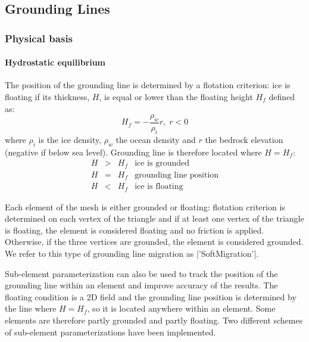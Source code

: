 
\subsection{Grounding Lines} \label{sec:using-issm-capabilities-grounding-lines}

\subsubsection{Physical basis}
\paragraph{Hydrostatic equilibrium}
The position of the grounding line is determined by a flotation criterion: ice is floating if its thickness, $H$, is equal or lower than the floating height $H_f$ defined as:
\begin{equation}
	H_f = - \frac{\rho_w}{\rho_i} r , \; r<0
\end{equation}
where $\rho_i$ is the ice density, $\rho_w$ the ocean density and $r$ the bedrock elevation (negative if below sea level). Grounding line is therefore located where $H = H_f$:
\begin{equation}
	\begin{array}{rcll}
		H & > & H_f & \text{ice is grounded}\\
		H & = & H_f & \text{grounding line position}\\
		H & < & H_f & \text{ice is floating}
	\end{array}
\end{equation}

Each element of the mesh is either grounded or floating: flotation criterion is determined on each vertex of the triangle and if at least one vertex of the triangle is floating, the element is considered floating and no friction is applied. Otherwise, if the three vertices are grounded, the element is considered grounded. We refer to this type of grounding line migration as \lstinlinebg|'SoftMigration'|.

Sub-element parameterization can also be used to track the position of the grounding line within an element and improve accuracy of the results. The floating condition is a 2D field and the grounding line position is determined by the line where $H = H_f$, so it is located anywhere within an element. Some elements are therefore partly grounded and partly floating. Two different schemes of sub-element parameterizations have been implemented.

